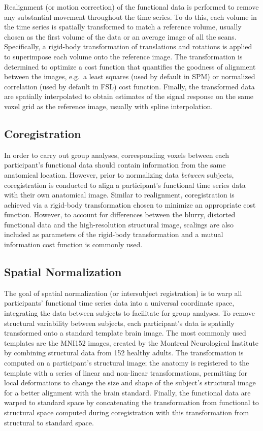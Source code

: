 Realignment (or motion correction) of the functional data is performed to remove any substantial movement throughout the time series. To do this, each volume in the time series is spatially transformed to match a reference volume, usually chosen as the first volume of the data or an average image of all the scans. Specifically, a rigid-body transformation of translations and rotations is applied to superimpose each volume onto the reference image. The transformation is determined to optimize a cost function that quantifies the goodness of alignment between the images, e.g.\ a least squares (used by default in SPM) or normalized correlation (used by default in FSL) cost function. Finally, the transformed data are spatially interpolated to obtain estimates of the signal response on the same voxel grid as the reference image, usually with spline interpolation.

\subsection{Coregistration}

In order to carry out group analyses, corresponding voxels between each participant's functional data should contain information from the same  anatomical location. However, prior to normalizing data \textit{between} subjects, coregistration is conducted to align a participant's functional time series data with their own anatomical image. Similar to realignment, coregistration is achieved via a rigid-body transformation chosen to minimize an appropriate cost function. However, to account for differences between the blurry, distorted functional data and the high-resolution structural image, scalings are also included as parameters of the rigid-body transformation and a mutual information cost function is commonly used.    

\subsection{Spatial Normalization}

The goal of spatial normalization (or intersubject registration) is to warp all participants' functional time series data into a universal coordinate space, integrating the data between subjects to facilitate for group analyses. To remove structural variability between subjects, each participant's data is spatially transformed onto a standard template brain image. The most commonly used templates are the MNI152 images, created by the Montreal Neurological Institute by combining structural data from 152 healthy adults. The transformation is computed on a participant's structural image; the anatomy is registered to the template with a series of linear and non-linear transformations, permitting for local deformations to change the size and shape of the subject's structural image for a better alignment with the brain standard. Finally, the functional data are warped to standard space by concatenating the transformation from functional to structural space computed during coregistration with this transformation from structural to standard space. 

